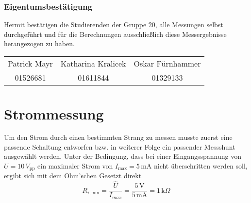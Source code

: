 \subsubsection{Eigentumsbestätigung}
Hermit bestätigen die Studierenden der Gruppe 20, alle Messungen selbst durchgeführt und für die Berechnungen ausschließlich diese Messergebnisse herangezogen zu haben.

\begin{tabular*}{\textwidth}{c|c|c}
	Patrick Mayr & Katharina Kralicek & Oskar Fürnhammer \\ 
	01526681 & 01611844 & 01329133 \\ 
\end{tabular*}


\section{Strommessung}
Um den Strom durch einen bestimmten Strang zu messen musste zuerst eine passende Schaltung entworfen bzw. in weiterer Folge ein passender Messshunt ausgewählt werden. Unter der Bedingung, dass bei einer Eingangsspannung von $U=10\,V_{\text{pp}}$ ein maximaler Strom von $I_{\text{max}}=5\,$mA nicht überschritten werden soll, ergibt sich mit dem Ohm'schen Gesetzt direkt
\begin{equation}
	R_{i,\text{min}} = \frac{\hat{U}}{I_{max}} = \frac{5\,\text{V}}{5\,\text{mA}} = 1\,\text{k}\Omega
	\label{eq:widerstandsdim}
\end{equation}
